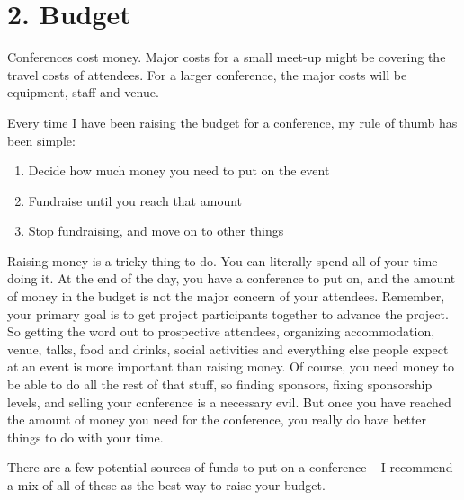 \section*{2. Budget}

Conferences cost money. Major costs for a small meet-up might be
covering the travel costs of attendees. For a larger conference, the
major costs will be equipment, staff and venue.

Every time I have been raising the budget for a conference, my rule of
thumb has been simple:
\begin{enumerate}
 \item Decide how much money you need to put on the event
 \item Fundraise until you reach that amount
 \item Stop fundraising, and move on to other things
\end{enumerate}

Raising money is a tricky thing to do. You can literally spend all of
your time doing it. At the end of the day, you have a conference to put
on, and the amount of money in the budget is not the major concern of
your attendees.
Remember, your primary goal is to get project participants together to
advance the project. So getting the word out to prospective attendees,
organizing accommodation, venue, talks, food and drinks, social
activities and everything else people expect at an event is more
important than raising money.
Of course, you need money to be able to do all the rest of that stuff,
so finding sponsors, fixing sponsorship levels, and selling your
conference is a necessary evil. But once you have reached the amount of
money you need for the conference, you really do have better things to
do with your time.

There are a few potential sources of funds to put on a conference -- I
recommend a mix of all of these as the best way to raise your budget.

